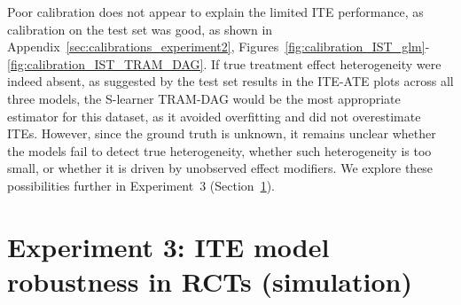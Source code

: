 Poor calibration does not appear to explain the limited ITE performance, as calibration on the test set was good, as shown in Appendix~\ref{sec:calibrations_experiment2}, Figures~\ref{fig:calibration_IST_glm}-\ref{fig:calibration_IST_TRAM_DAG}. If true treatment effect heterogeneity were indeed absent, as suggested by the test set results in the ITE-ATE plots across all three models, the S-learner TRAM-DAG would be the most appropriate estimator for this dataset, as it avoided overfitting and did not overestimate ITEs. However, since the ground truth is unknown, it remains unclear whether the models fail to detect true heterogeneity, whether such heterogeneity is too small, or whether it is driven by unobserved effect modifiers. We explore these possibilities further in Experiment~3 (Section~\ref{ch:experiment3}).

% 
% 
% 
% 
% 









\section{Experiment 3: ITE model robustness in RCTs (simulation)} \label{ch:experiment3}




